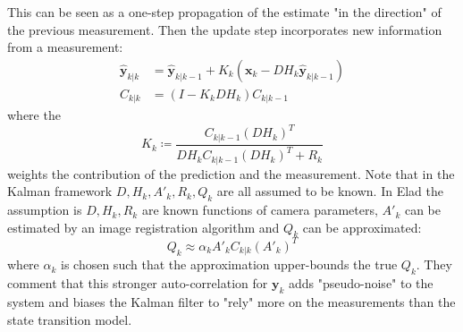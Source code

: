 This can be seen as a one-step propagation of the estimate "in the direction" of the previous measurement.
%
Then the update step incorporates new information from a measurement:
\begin{align}
    \hat{\bm{y}}_{k|k} &= \hat{\bm{y}}_{k|k-1} + K_k(\bm{x}_k - DH_k\hat{\bm{y}}_{k|k-1} ) \\
    C_{k|k} &= (I - K_k DH_k)C_{k|k-1}
\end{align}
where the 
\begin{equation}
    K_k \coloneqq \frac{C_{k|k-1}(DH_k)^T}{DH_k C_{k|k-1} (DH_k)^T + R_k }
\end{equation}
weights the contribution of the prediction and the measurement.
%
Note that in the Kalman framework $D, H_k, A'_k, R_k, Q_k$ are all assumed to be known.
%
In Elad \etal\cite{elad1999} the assumption is $D, H_k, R_k$ are known functions of camera parameters, $A'_k$ can be estimated by an image registration algorithm and $Q_k$ can be approximated:
\begin{equation}
    Q_k \approx \alpha_k A'_k C_{k|k} (A'_k)^T
\end{equation}
where $\alpha_k$ is chosen such that the approximation upper-bounds the true $Q_k$.
%
They comment that this stronger auto-correlation for $\bm{y}_k$ adds "pseudo-noise" to the system and biases the Kalman filter to "rely" more on the measurements than the state transition model.

